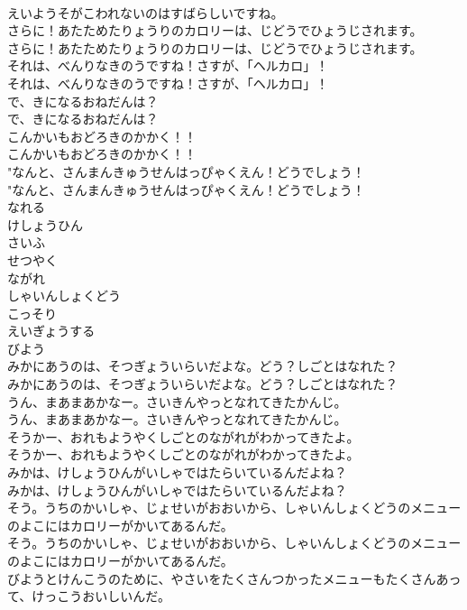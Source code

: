 \documentclass[8pt]{extreport}
\begin{document}
\begin{CJK}{UTF8}{min}
\\	えいようそがこわれないのはすばらしいですね。 
\\	さらに！あたためたりょうりのカロリーは、じどうでひょうじされます。	
\\	さらに！あたためたりょうりのカロリーは、じどうでひょうじされます。 
\\	それは、べんりなきのうですね！さすが、「ヘルカロ」！	
\\	それは、べんりなきのうですね！さすが、「ヘルカロ」！ 
\\	で、きになるおねだんは？	
\\	で、きになるおねだんは？ 
\\	こんかいもおどろきのかかく！！	
\\	こんかいもおどろきのかかく！！ 
\\	"なんと、さんまんきゅうせんはっぴゃくえん！どうでしょう！
\\	"なんと、さんまんきゅうせんはっぴゃくえん！どうでしょう！
\\	なれる
\\	けしょうひん
\\	さいふ
\\	せつやく
\\	ながれ
\\	しゃいんしょくどう
\\	こっそり
\\	えいぎょうする
\\	びよう
\\	みかにあうのは、そつぎょういらいだよな。どう？しごとはなれた？	
\\	みかにあうのは、そつぎょういらいだよな。どう？しごとはなれた？ 
\\	うん、まあまあかなー。さいきんやっとなれてきたかんじ。	
\\	うん、まあまあかなー。さいきんやっとなれてきたかんじ。 
\\	そうかー、おれもようやくしごとのながれがわかってきたよ。	
\\	そうかー、おれもようやくしごとのながれがわかってきたよ。 
\\	みかは、けしょうひんがいしゃではたらいているんだよね？	
\\	みかは、けしょうひんがいしゃではたらいているんだよね？ 
\\	そう。うちのかいしゃ、じょせいがおおいから、しゃいんしょくどうのメニューのよこにはカロリーがかいてあるんだ。	
\\	そう。うちのかいしゃ、じょせいがおおいから、しゃいんしょくどうのメニューのよこにはカロリーがかいてあるんだ。 
\\	びようとけんこうのために、やさいをたくさんつかったメニューもたくさんあって、けっこうおいしいんだ。	

\end{CJK}
\end{document}
